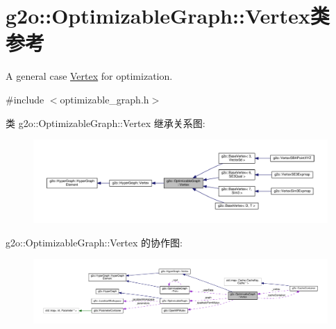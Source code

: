 \hypertarget{classg2o_1_1OptimizableGraph_1_1Vertex}{\section{g2o\-:\-:Optimizable\-Graph\-:\-:Vertex类 参考}
\label{classg2o_1_1OptimizableGraph_1_1Vertex}
}


A general case \hyperlink{classg2o_1_1OptimizableGraph_1_1Vertex}{Vertex} for optimization.  




{\ttfamily \#include $<$optimizable\-\_\-graph.\-h$>$}



类 g2o\-:\-:Optimizable\-Graph\-:\-:Vertex 继承关系图\-:
\nopagebreak
\begin{figure}[H]
\begin{center}
\leavevmode
\includegraphics[width=350pt]{classg2o_1_1OptimizableGraph_1_1Vertex__inherit__graph}
\end{center}
\end{figure}


g2o\-:\-:Optimizable\-Graph\-:\-:Vertex 的协作图\-:
\nopagebreak
\begin{figure}[H]
\begin{center}
\leavevmode
\includegraphics[width=350pt]{classg2o_1_1OptimizableGraph_1_1Vertex__coll__graph}
\end{center}
\end{figure}
